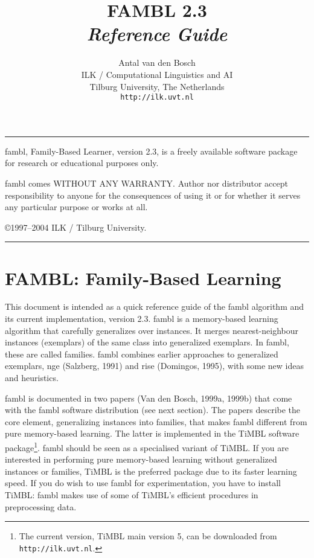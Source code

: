 \documentclass[11pt]{article}
\begin{document}
\title{FAMBL 2.3 \\ {\sl Reference Guide}}
\author{Antal van den Bosch \\ ILK / Computational Linguistics and AI\\
Tilburg University, The Netherlands \\ {\tt http://ilk.uvt.nl} }

\maketitle

\vspace*{6cm}

\rule{\textwidth}{1.0mm}

{\sc fambl}, Family-Based Learner, version 2.3, is a freely available
software package for research or educational purposes only. 

{\sc fambl} comes WITHOUT ANY WARRANTY. Author nor distributor accept
responsibility to anyone for the consequences of using it or for
whether it serves any particular purpose or works at all.

\copyright 1997--2004 ILK / Tilburg University.

\rule{\textwidth}{0.5mm}

\clearpage

\section{FAMBL: Family-Based Learning}

This document is intended as a quick reference guide of the {\sc
fambl} algorithm and its current implementation, version 2.3. {\sc
fambl} is a memory-based learning algorithm that carefully generalizes
over instances. It merges nearest-neighbour instances (exemplars) of
the same class into generalized exemplars. In {\sc fambl}, these are
called families. {\sc fambl} combines earlier approaches to
generalized exemplars, {\sc nge} (Salzberg, 1991) and {\sc rise}
(Domingos, 1995), with some new ideas and heuristics.

{\sc fambl} is documented in two papers (Van den Bosch, 1999a, 1999b)
that come with the {\sc fambl} software distribution (see next
section). The papers describe the core element, generalizing instances
into families, that makes {\sc fambl} different from pure memory-based
learning. The latter is implemented in the {\sc TiMBL} software
package\footnote{The current version, {\sc TiMBL} main version 5, can be
  downloaded from {\tt http://ilk.uvt.nl}.}. {\sc fambl} should be
seen as a specialised variant of {\sc TiMBL}. If you are interested in
performing pure memory-based learning without generalized instances or
families, {\sc TiMBL} is the preferred package due to its faster learning
speed. If you do wish to use {\sc fambl} for experimentation, you have
to install {\sc TiMBL}: {\sc fambl} makes use of some of {\sc TiMBL}'s efficient
procedures in preprocessing data.
\end{document}
